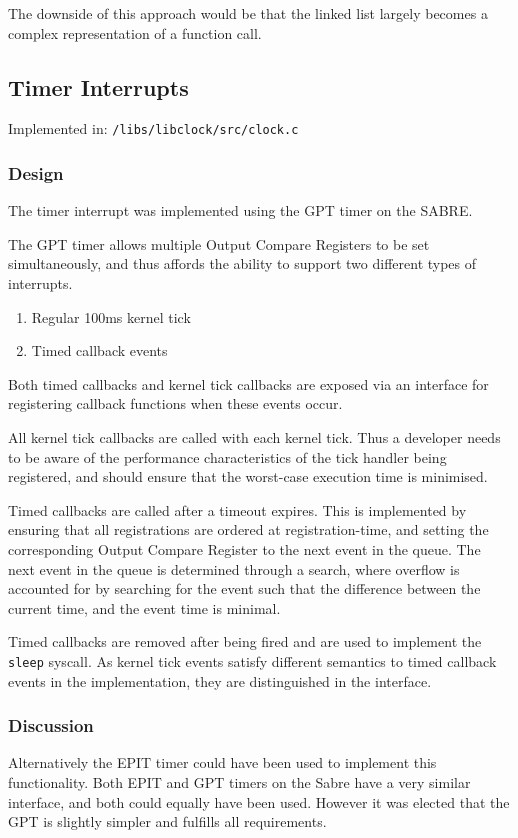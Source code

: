 \documentclass[a4paper,12pt]{article}
\begin{document}
The downside of this approach would be that the linked list largely becomes a
complex representation of a function call.

\subsection{Timer Interrupts}
Implemented in: \texttt{/libs/libclock/src/clock.c}

\subsubsection{Design}
The timer interrupt was implemented using the GPT timer on the SABRE.

The GPT timer allows multiple Output Compare Registers to be set
simultaneously, and thus affords the ability to support two different types of
interrupts.

\begin{enumerate}
\item Regular 100ms kernel tick
\item Timed callback events
\end{enumerate}

Both timed callbacks and kernel tick callbacks are exposed via an interface
for registering callback functions when these events occur.

All kernel tick callbacks are called with each kernel tick.  Thus a developer
needs to be aware of the performance characteristics of the tick handler being
registered, and should ensure that the worst-case execution time is minimised.

Timed callbacks are called after a timeout expires.  This is implemented by
ensuring that all registrations are ordered at registration-time, and setting
the corresponding Output Compare Register to the next event in the queue.  The
next event in the queue is determined through a search, where overflow is
accounted for by searching for the event such that the difference between the
current time, and the event time is minimal.

Timed callbacks are removed after being fired and are used to implement the
\texttt{sleep} syscall.  As kernel tick events satisfy different semantics to
timed callback events in the implementation, they are distinguished in the
interface.

\subsubsection{Discussion}
Alternatively the EPIT timer could have been used to implement this
functionality.  Both EPIT and GPT timers on the Sabre have a very similar
interface, and both could equally have been used.  However it was elected that
the GPT is slightly simpler and fulfills all requirements.
\end{document}
